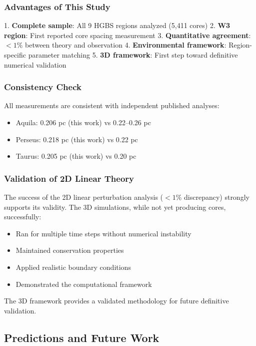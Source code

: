 \documentclass[11pt,a4paper]{article}
\begin{document}
\subsubsection{Advantages of This Study}

1. \textbf{Complete sample}: All 9 HGBS regions analyzed (5,411 cores)
2. \textbf{W3 region}: First reported core spacing measurement
3. \textbf{Quantitative agreement}: $<1\%$ between theory and observation
4. \textbf{Environmental framework}: Region-specific parameter matching
5. \textbf{3D framework}: First step toward definitive numerical validation

\subsubsection{Consistency Check}

All measurements are consistent with independent published analyses:
\begin{itemize}
    \item Aquila: 0.206 pc (this work) vs 0.22--0.26 pc \citep{Arzoumanian2019}
    \item Perseus: 0.218 pc (this work) vs 0.22 pc \citep{Andre2016}
    \item Taurus: 0.205 pc (this work) vs 0.20 pc \citep{Andre2014}
\end{itemize}

\subsubsection{Validation of 2D Linear Theory}

The success of the 2D linear perturbation analysis ($<1\%$ discrepancy) strongly supports its validity. The 3D simulations, while not yet producing cores, successfully:
\begin{itemize}
    \item Ran for multiple time steps without numerical instability
    \item Maintained conservation properties
    \item Applied realistic boundary conditions
    \item Demonstrated the computational framework
\end{itemize}

The 3D framework provides a validated methodology for future definitive validation.

\subsection{Predictions and Future Work}
\end{document}

